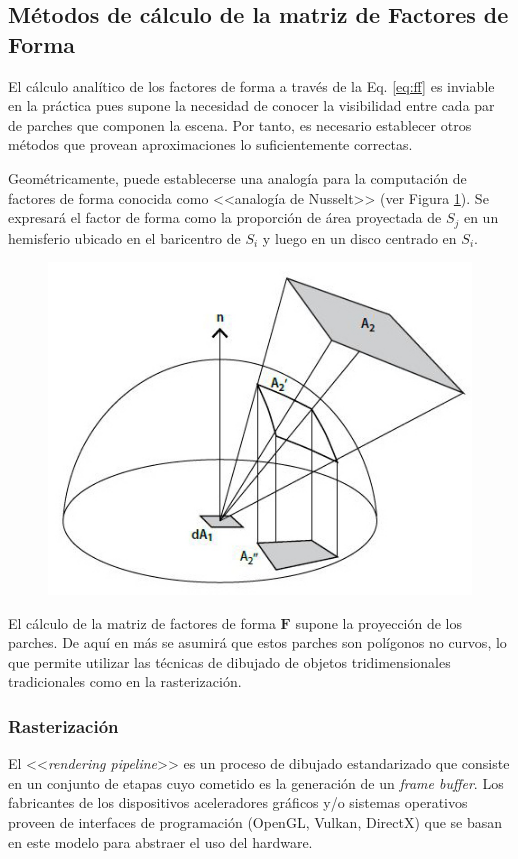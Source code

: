\subsection{Métodos de cálculo de la matriz de Factores de Forma}
\label{sec:calculoff}

El cálculo analítico de los factores de forma a través de la Eq. \eqref{eq:ff} es inviable en la práctica pues supone la necesidad de conocer la visibilidad entre cada par de parches que componen la escena. Por tanto, es necesario establecer otros métodos que provean aproximaciones lo suficientemente correctas.

Geométricamente, puede establecerse una analogía para la computación de factores de forma conocida como <<analogía de Nusselt>> (ver Figura \ref{img:nusselt}). Se expresará el factor de forma como la proporción de área proyectada de $S_{j}$ en un hemisferio ubicado en el baricentro de $S_{i}$ y luego en un disco centrado en $S_{i}$.

\begin{figure}[H]
	\centering
	\includegraphics[width=0.55\linewidth]{assets/nusselt}
	\label{img:nusselt}
\end{figure}

El cálculo de la matriz de factores de forma $\mathbf{F}$ supone la proyección de los parches. De aquí en más se asumirá que estos parches son polígonos no curvos, lo que permite utilizar las técnicas de dibujado de objetos tridimensionales tradicionales como en la rasterización.

\subsubsection{Rasterización}
\label{sec:rasterizacion}

El <<\textit{rendering pipeline}>> es un proceso de dibujado estandarizado que consiste en un conjunto de etapas cuyo cometido es la generación de un \textit{frame buffer}. Los fabricantes de los dispositivos aceleradores gráficos y/o sistemas operativos proveen de interfaces de programación (OpenGL, Vulkan, DirectX) que se basan en este modelo para abstraer el uso del hardware.

